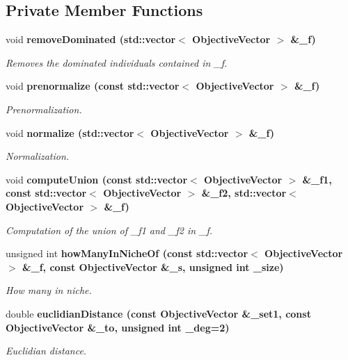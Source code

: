 \subsection*{Private Member Functions}
\begin{CompactItemize}
\item 
void \bf{remove\-Dominated} (std::vector$<$ \bf{Objective\-Vector} $>$ \&\_\-f)
\begin{CompactList}\small\item\em Removes the dominated individuals contained in \_\-f. \item\end{CompactList}\item 
void \bf{prenormalize} (const std::vector$<$ \bf{Objective\-Vector} $>$ \&\_\-f)
\begin{CompactList}\small\item\em Prenormalization. \item\end{CompactList}\item 
void \bf{normalize} (std::vector$<$ \bf{Objective\-Vector} $>$ \&\_\-f)
\begin{CompactList}\small\item\em Normalization. \item\end{CompactList}\item 
void \bf{compute\-Union} (const std::vector$<$ \bf{Objective\-Vector} $>$ \&\_\-f1, const std::vector$<$ \bf{Objective\-Vector} $>$ \&\_\-f2, std::vector$<$ \bf{Objective\-Vector} $>$ \&\_\-f)
\begin{CompactList}\small\item\em Computation of the union of \_\-f1 and \_\-f2 in \_\-f. \item\end{CompactList}\item 
unsigned int \bf{how\-Many\-In\-Niche\-Of} (const std::vector$<$ \bf{Objective\-Vector} $>$ \&\_\-f, const \bf{Objective\-Vector} \&\_\-s, unsigned int \_\-size)\label{classmoeoEntropyMetric_7977dac672bd6e2e1dfff8cf7954c180}

\begin{CompactList}\small\item\em How many in niche. \item\end{CompactList}\item 
double \bf{euclidian\-Distance} (const \bf{Objective\-Vector} \&\_\-set1, const \bf{Objective\-Vector} \&\_\-to, unsigned int \_\-deg=2)\label{classmoeoEntropyMetric_4716a673498a0681fb78414e390824a3}

\begin{CompactList}\small\item\em Euclidian distance. \item\end{CompactList}\end{CompactItemize}
